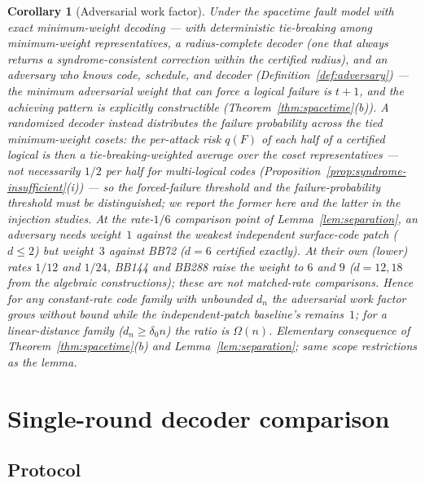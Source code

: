 \documentclass[11pt,a4paper]{article}
\newtheorem{corollary}{Corollary}\newtheorem{proposition}{Proposition}
\begin{document}
\begin{corollary}[Adversarial work factor]\label{cor:workfactor}
Under the spacetime fault model with exact minimum-weight decoding ---
with \emph{deterministic tie-breaking} among minimum-weight
representatives, a \emph{radius-complete} decoder (one that always
returns a syndrome-consistent correction within the certified radius),
and an adversary who \emph{knows} code, schedule, and decoder
(Definition~\ref{def:adversary}) --- the
minimum adversarial weight that can force a logical failure is
$t{+}1$, and the achieving pattern is explicitly constructible
(Theorem~\ref{thm:spacetime}(b)). A randomized decoder instead
distributes the failure probability across the tied minimum-weight
cosets: the per-attack risk $q(F)$ of each half of a certified logical
is then a tie-breaking-weighted average over the coset representatives
--- not necessarily $1/2$ per half for multi-logical codes
(Proposition~\ref{prop:syndrome-insufficient}(i)) --- so the
\emph{forced}-failure threshold and the
\emph{failure-probability} threshold must be distinguished; we report
the former here and the latter in the injection studies. At the rate-$1/6$ comparison point
of Lemma~\ref{lem:separation}, an adversary needs weight~$1$ against
the weakest independent surface-code patch ($d\le2$) but weight~$3$
against BB72 ($d=6$ certified exactly). At their own (lower) rates
$1/12$ and $1/24$, BB144 and BB288 raise the weight to $6$ and $9$
($d=12,18$ from the algebraic constructions); these are not
matched-rate comparisons. Hence for any
constant-rate code family with unbounded $d_n$ the adversarial work
factor grows without bound while the independent-patch baseline's
remains~$1$; for a linear-distance family ($d_n\ge\delta_0 n$) the
ratio is $\Omega(n)$.
\emph{Elementary consequence of Theorem~\ref{thm:spacetime}(b) and
Lemma~\ref{lem:separation}; same scope restrictions as the lemma.}
\end{corollary}

\section{Single-round decoder comparison}
\label{sec:benchmark}

\subsection{Protocol}
\end{document}

